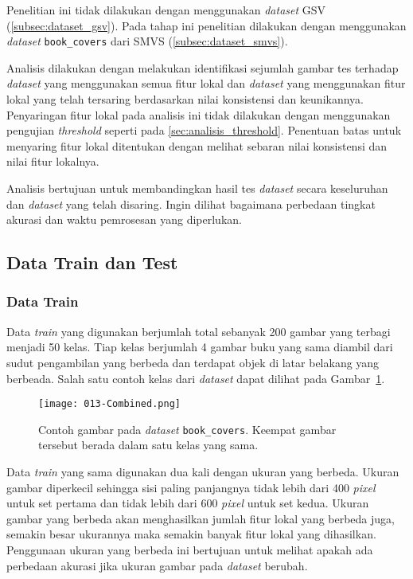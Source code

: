 Penelitian ini tidak dilakukan dengan menggunakan \textit{dataset} GSV (\ref{subsec:dataset_gsv}). Pada tahap ini penelitian dilakukan dengan menggunakan \textit{dataset} \texttt{book\_covers} dari SMVS (\ref{subsec:dataset_smvs}).

Analisis dilakukan dengan melakukan identifikasi sejumlah gambar tes terhadap \textit{dataset} yang menggunakan semua fitur lokal dan \textit{dataset} yang menggunakan fitur lokal yang telah tersaring berdasarkan nilai konsistensi dan keunikannya. Penyaringan fitur lokal pada analisis ini tidak dilakukan dengan menggunakan pengujian \textit{threshold} seperti pada \ref{sec:analisis_threshold}. Penentuan batas untuk menyaring fitur lokal ditentukan dengan melihat sebaran nilai konsistensi dan nilai fitur lokalnya.

Analisis bertujuan untuk membandingkan hasil tes \textit{dataset} secara keseluruhan dan \textit{dataset} yang telah disaring. Ingin dilihat bagaimana perbedaan tingkat akurasi dan waktu pemrosesan yang diperlukan. 

\subsection{Data Train dan Test}
\subsubsection{Data Train}
Data \textit{train} yang digunakan berjumlah total sebanyak 200 gambar yang terbagi menjadi 50 kelas. Tiap kelas berjumlah 4 gambar buku yang sama diambil dari sudut pengambilan yang berbeda dan terdapat objek di latar belakang yang berbeada. Salah satu contoh kelas dari \textit{dataset} dapat dilihat pada Gambar~\ref{fig:contoh_book_covers}.
\begin{figure}[H]
	\centering
	\texttt{[image: 013-Combined.png]}
	\caption{Contoh gambar pada \textit{dataset} \texttt{book\_covers}. Keempat gambar tersebut berada dalam satu kelas yang sama.}
	\label{fig:contoh_book_covers}
\end{figure}

Data \textit{train} yang sama digunakan dua kali dengan ukuran yang berbeda. Ukuran gambar diperkecil sehingga sisi paling panjangnya tidak lebih dari 400 \textit{pixel} untuk set pertama dan tidak lebih dari 600 \textit{pixel} untuk set kedua. Ukuran gambar yang berbeda akan menghasilkan jumlah fitur lokal yang berbeda juga, semakin besar ukurannya maka semakin banyak fitur lokal yang dihasilkan. Penggunaan ukuran yang berbeda ini bertujuan untuk melihat apakah ada perbedaan akurasi jika ukuran gambar pada \textit{dataset} berubah.

